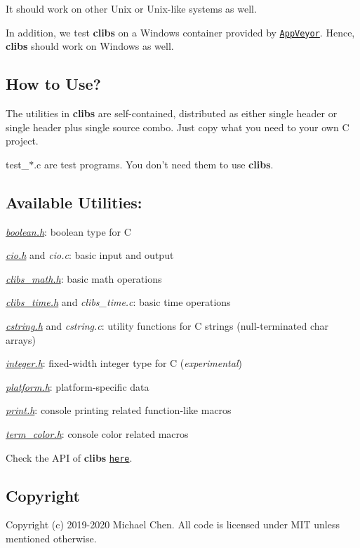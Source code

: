 It should work on other Unix or Unix-\/like systems as well.

In addition, we test {\bfseries clibs} on a Windows container provided by \href{https://www.appveyor.com/}{\tt App\-Veyor}. Hence, {\bfseries clibs} should work on Windows as well.

\subsection*{How to Use?}

The utilities in {\bfseries clibs} are self-\/contained, distributed as either single header or single header plus single source combo. Just copy what you need to your own C project.

test\-\_\-$\ast$.c are test programs. You don't need them to use {\bfseries clibs}.

\subsection*{Available Utilities\-:}


\begin{DoxyItemize}
\item {\itshape \hyperlink{boolean_8h}{boolean.\-h}}\-: boolean type for C
\item {\itshape \hyperlink{cio_8h}{cio.\-h}} and {\itshape cio.\-c}\-: basic input and output
\item {\itshape \hyperlink{clibs__math_8h}{clibs\-\_\-math.\-h}}\-: basic math operations
\item {\itshape \hyperlink{clibs__time_8h}{clibs\-\_\-time.\-h}} and {\itshape clibs\-\_\-time.\-c}\-: basic time operations
\item {\itshape \hyperlink{cstring_8h}{cstring.\-h}} and {\itshape cstring.\-c}\-: utility functions for C strings (null-\/terminated {\ttfamily char} arrays)
\item {\itshape \hyperlink{integer_8h}{integer.\-h}}\-: fixed-\/width integer type for C ({\itshape experimental})
\item {\itshape \hyperlink{platform_8h}{platform.\-h}}\-: platform-\/specific data
\item {\itshape \hyperlink{print_8h}{print.\-h}}\-: console printing related function-\/like macros
\item {\itshape \hyperlink{term__color_8h}{term\-\_\-color.\-h}}\-: console color related macros
\end{DoxyItemize}

Check the A\-P\-I of {\bfseries clibs} \href{https://cwchentw.github.io/clibs/html/index.html}{\tt here}.

\subsection*{Copyright}

Copyright (c) 2019-\/2020 Michael Chen. All code is licensed under M\-I\-T unless mentioned otherwise. 